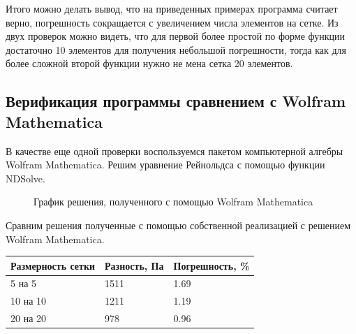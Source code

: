 \documentclass[a4paper,14pt]{extarticle}
\begin{document}
Итого можно делать вывод, что на приведенных примерах программа считает верно, погрешность сокращается с увеличением числа элементов на сетке. Из двух проверок можно видеть, что для первой более простой по форме функции достаточно 10 элементов для получения небольшой погрешности, тогда как для более сложной второй функции нужно не мена сетка 20 элементов.



\subsection{Верификация программы сравнением с Wolfram Mathematica}

В качестве еще одной проверки воспользуемся пакетом компьютерной алгебры Wolfram Mathematica.
Решим уравнение Рейнольдса с помощью функции NDSolve.

\begin{figure}[!htbp]
	\caption{График решения, полученного с помощью Wolfram Mathematica}
	\label{w_sol}
\end{figure}

Сравним решения полученные с помощью собственной реализацией с решением Wolfram Mathematica.

\begin{table}[!htbp]
	\begin{tabular}{|l|l|l|}
		\hline
		\multicolumn{1}{|c|}{Размерность сетки} & \multicolumn{1}{c|}{Разность, Па} & Погрешность, \% \\ \hline
		5 на 5                                  & 1511	                              & 1.69            \\ \hline
		10 на 10                                & 1211                              & 1.19            \\ \hline
		20 на 20                                & 978                              & 0.96            \\ \hline
	\end{tabular}
\end{table}
\end{document}
